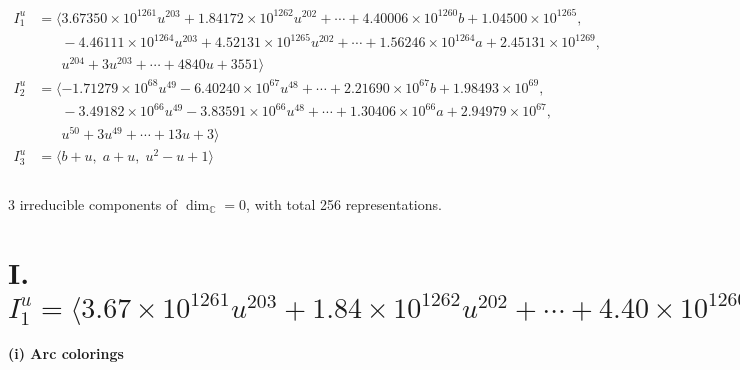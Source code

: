 \documentclass[1p]{elsarticle_modified}
\theoremstyle{definition}
\begin{document}
\begin{align*}
I^u_{1}&=\langle 
3.67350\times10^{1261} u^{203}+1.84172\times10^{1262} u^{202}+\cdots+4.40006\times10^{1260} b+1.04500\times10^{1265},\\
\phantom{I^u_{1}}&\phantom{= \langle  }-4.46111\times10^{1264} u^{203}+4.52131\times10^{1265} u^{202}+\cdots+1.56246\times10^{1264} a+2.45131\times10^{1269},\\
\phantom{I^u_{1}}&\phantom{= \langle  }u^{204}+3 u^{203}+\cdots+4840 u+3551\rangle \\
I^u_{2}&=\langle 
-1.71279\times10^{68} u^{49}-6.40240\times10^{67} u^{48}+\cdots+2.21690\times10^{67} b+1.98493\times10^{69},\\
\phantom{I^u_{2}}&\phantom{= \langle  }-3.49182\times10^{66} u^{49}-3.83591\times10^{66} u^{48}+\cdots+1.30406\times10^{66} a+2.94979\times10^{67},\\
\phantom{I^u_{2}}&\phantom{= \langle  }u^{50}+3 u^{49}+\cdots+13 u+3\rangle \\
I^u_{3}&=\langle 
b+u,\;a+u,\;u^2- u+1\rangle \\
\\
\end{align*}
\raggedright * 3 irreducible components of $\dim_{\mathbb{C}}=0$, with total 256 representations.\\
\newpage
\renewcommand{\arraystretch}{1}
\centering \section*{I. $I^u_{1}= \langle 3.67\times10^{1261} u^{203}+1.84\times10^{1262} u^{202}+\cdots+4.40\times10^{1260} b+1.04\times10^{1265},\;-4.46\times10^{1264} u^{203}+4.52\times10^{1265} u^{202}+\cdots+1.56\times10^{1264} a+2.45\times10^{1269},\;u^{204}+3 u^{203}+\cdots+4840 u+3551 \rangle$}
\flushleft \textbf{(i) Arc colorings}\\
\end{document}
